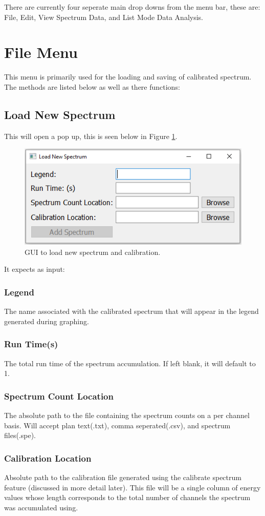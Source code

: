 There are currently four seperate main drop downs from the menu bar, these are: File, Edit, View Spectrum Data, and List Mode Data Analysis.
\section{File Menu}
	This menu is primarily used for the loading and saving of calibrated spectrum. The methods are listed below as well as there functions:
		\subsection{Load New Spectrum}
			This will open a pop up, this is seen below in Figure \ref{fig:load_new}. \\
				\begin{figure}[h!]
					\centering
					\includegraphics[width=0.7\linewidth]{Load_New.png}
					\caption{GUI to load new spectrum and calibration.}
					\label{fig:load_new}
				\end{figure}
		It expects as input:
				\subsubsection{Legend} 
					The name associated with the calibrated spectrum that will appear in the legend generated during graphing.
				\subsubsection{Run Time(s)}
				 The total run time of the spectrum accumulation. If left blank, it will default to 1.
				\subsubsection{Spectrum Count Location}
				 The absolute path to the file containing the spectrum counts on a per channel basis. Will accept plan text(.txt), comma seperated(.csv), and spectrum files(.spe).
				\subsubsection{Calibration Location}
				 Absolute path to the calibration file generated using the calibrate spectrum feature (discussed in more detail later). This file will be a single column of energy values whose length corresponds to the total number of channels the spectrum was accumulated using. 

